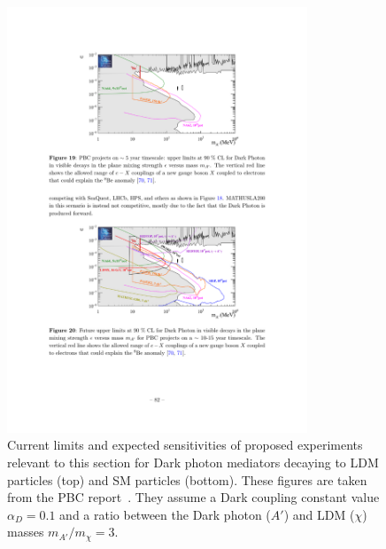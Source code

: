 \documentclass[../report.tex]{subfiles}
\begin{document}
\begin{figure}
    \includegraphics[width=0.8\textwidth]{Darkmatter/section3/pbc_bc1.pdf}
    \caption{Current limits and expected sensitivities of proposed experiments relevant to this section for Dark photon mediators decaying to LDM particles (top) and SM particles (bottom). These figures are taken from the PBC report~\cite{Beacham:2019nyx}. They assume a Dark coupling constant value $\alpha_D = 0.1$ and a ratio between the Dark photon ($A'$) and LDM ($\chi$) masses $m_{A'}/m_\chi = 3$.}
    \label{fig:sec3_sensitivity}
\end{figure}

\end{document}
